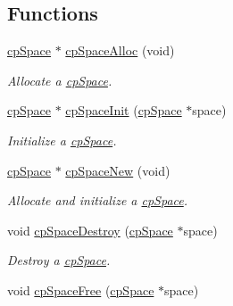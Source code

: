 \subsection*{Functions}
\begin{DoxyCompactItemize}
\item 
\hypertarget{group__cp_space_gaeed23237c8a7b052ec816b339c7e60dd}{}\hyperlink{structcp_space}{cp\+Space} $\ast$ \hyperlink{group__cp_space_gaeed23237c8a7b052ec816b339c7e60dd}{cp\+Space\+Alloc} (void)\label{group__cp_space_gaeed23237c8a7b052ec816b339c7e60dd}

\begin{DoxyCompactList}\small\item\em Allocate a \hyperlink{structcp_space}{cp\+Space}. \end{DoxyCompactList}\item 
\hypertarget{group__cp_space_ga3e668d762b5b6438b51f7af0fb32ff09}{}\hyperlink{structcp_space}{cp\+Space} $\ast$ \hyperlink{group__cp_space_ga3e668d762b5b6438b51f7af0fb32ff09}{cp\+Space\+Init} (\hyperlink{structcp_space}{cp\+Space} $\ast$space)\label{group__cp_space_ga3e668d762b5b6438b51f7af0fb32ff09}

\begin{DoxyCompactList}\small\item\em Initialize a \hyperlink{structcp_space}{cp\+Space}. \end{DoxyCompactList}\item 
\hypertarget{group__cp_space_gac6293d85ec533d496e3005d194c1e62b}{}\hyperlink{structcp_space}{cp\+Space} $\ast$ \hyperlink{group__cp_space_gac6293d85ec533d496e3005d194c1e62b}{cp\+Space\+New} (void)\label{group__cp_space_gac6293d85ec533d496e3005d194c1e62b}

\begin{DoxyCompactList}\small\item\em Allocate and initialize a \hyperlink{structcp_space}{cp\+Space}. \end{DoxyCompactList}\item 
\hypertarget{group__cp_space_ga964c2ec74cf2527fa17142b6009796c5}{}void \hyperlink{group__cp_space_ga964c2ec74cf2527fa17142b6009796c5}{cp\+Space\+Destroy} (\hyperlink{structcp_space}{cp\+Space} $\ast$space)\label{group__cp_space_ga964c2ec74cf2527fa17142b6009796c5}

\begin{DoxyCompactList}\small\item\em Destroy a \hyperlink{structcp_space}{cp\+Space}. \end{DoxyCompactList}\item 
\hypertarget{group__cp_space_ga1fe399459fcb74d30eb29a73af26cd0c}{}void \hyperlink{group__cp_space_ga1fe399459fcb74d30eb29a73af26cd0c}{cp\+Space\+Free} (\hyperlink{structcp_space}{cp\+Space} $\ast$space)\label{group__cp_space_ga1fe399459fcb74d30eb29a73af26cd0c}


\end{DoxyCompactItemize}
